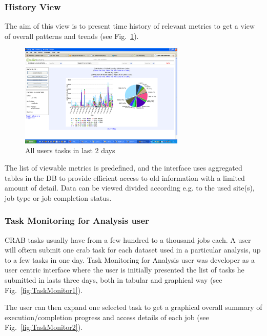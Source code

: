 \subsubsection{History View}
The aim of this view is to present time history of relevant
metrics to get a view of overall patterns and trends (see Fig.~\ref{fig:HistoryView}).
\begin{figure}
 \includegraphics[width=0.70\textwidth]{figures/HistoryView.png}
\caption{All users tasks in last 2 days}
\label{fig:HistoryView}
\end{figure}
The list of viewable metrics is predefined, and
the interface uses aggregated tables in the DB to provide
efficient access to old information with a limited
amount of detail. Data can be viewed divided
according e.g. to the used site(s), job type or job completion status.


\subsubsection{Task Monitoring for Analysis user}
CRAB tasks usually have from a few hundred
to a thousand jobs each. A user will oftern submit one crab task
for each dataset used in a particular analysis, up to a few
tasks in one day. Task Monitoring for Analysis user was
developer as a user centric interface where the user is
initially presented the list of tasks he submitted in lasts
three days, both in tabular and graphical way (see Fig.~\ref{fig:TaskMonitor1}).

The user can then expand one selected task to get
a graphical overall summary of execution/completion progress
and access details of each job (see Fig.~\ref{fig:TaskMonitor2}).


